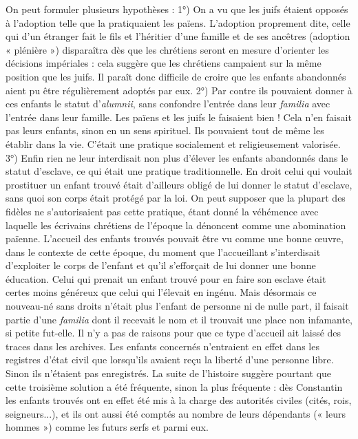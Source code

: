  On peut formuler plusieurs hypothèses : 1°) On a vu que les juifs étaient opposés à l'adoption telle que la pratiquaient les païens. L'adoption proprement dite, celle qui d'un étranger fait le fils et l'héritier d'une famille et de ses ancêtres (adoption « plénière ») disparaîtra dès que les chrétiens seront en mesure d'orienter les décisions impériales : cela suggère que les chrétiens campaient sur la même position que les juifs. Il paraît donc difficile de croire que les enfants abandonnés aient pu être régulièrement adoptés par eux. 2°) Par contre ils pouvaient donner à ces enfants le statut d'\emph{alumnii}, sans confondre l'entrée dans leur \emph{familia} avec l'entrée dans leur famille. Les païens et les juifs le faisaient bien ! Cela n'en faisait pas leurs enfants, sinon en un sens spirituel. Ils pouvaient tout de même les établir dans la vie. C'était une pratique socialement et religieusement valorisée. 3°) Enfin rien ne leur interdisait non plus d'élever les enfants abandonnés dans le statut d'esclave, ce qui était une pratique traditionnelle. 
 En droit celui qui voulait prostituer un enfant trouvé était d'ailleurs obligé de lui donner le statut d'esclave, sans quoi son corps était protégé par la loi. On peut supposer que la plupart des fidèles ne s'autorisaient pas cette pratique, étant donné la véhémence avec laquelle les écrivains chrétiens de l'époque la dénoncent comme une abomination païenne. L'accueil des enfants trouvés pouvait être vu comme une bonne œuvre, dans le contexte de cette époque, du moment que l'accueillant s'interdisait d'exploiter le corps de l'enfant et qu'il s'efforçait de lui donner une bonne éducation. Celui qui prenait un enfant trouvé pour en faire son esclave était certes moins généreux que celui qui l'élevait en ingénu. Mais désormais ce nouveau-né sans droits n'était plus l'enfant de personne ni de nulle part, il faisait partie d'une \emph{familia} dont il recevait le nom et il trouvait une place non infamante, si petite fut-elle.
 Il n'y a pas de raisons pour que ce type d'accueil ait laissé des traces dans les archives. Les enfants concernés n'entraient en effet dans les registres d'état civil que lorsqu'ils avaient reçu la liberté d'une personne libre. Sinon ils n'étaient pas enregistrés. La suite de l'histoire suggère pourtant que cette troisième solution a été fréquente, sinon la plus fréquente : dès Constantin les enfants trouvés ont en effet été mis à la charge des autorités civiles (cités, rois, seigneurs...), et ils ont aussi été comptés au nombre de leurs dépendants (« leurs hommes ») comme les futurs serfs et parmi eux. 
 
